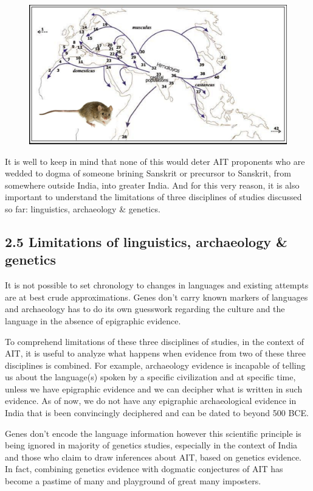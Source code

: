 \newpage

\begin{figure}[!htbp]
\includegraphics[scale=0.22]{"images/8-11.jpg"}
\caption{}\label{art8-fig11}
\end{figure}

It is well to keep in mind that none of this would deter AIT proponents who are wedded to dogma of someone brining Sanskrit or precursor to Sanskrit, from somewhere outside India, into greater India. And for this very reason, it is also important to understand the limitations of three disciplines of studies discussed so far: linguistics, archaeology \& genetics.


\subsection*{2.5 Limitations of linguistics, archaeology \& genetics}

It is not possible to set chronology to changes in languages and existing attempts are at best crude approximations. Genes don’t carry known markers of languages and archaeology has to do its own guesswork regarding the culture and the language in the absence of epigraphic evidence.

To comprehend limitations of these three disciplines of studies, in the context of AIT, it is useful to analyze what happens when evidence from two of these three disciplines is combined. For example, archaeology evidence is incapable of telling us about the language(s) spoken by a specific civilization and at specific time, unless we have epigraphic evidence and we can decipher what is written in such evidence. As of now, we do not have any epigraphic archaeological evidence in India that is been convincingly deciphered and can be dated to beyond 500 BCE.

Genes don’t encode the language information however this scientific principle is being ignored in majority of genetics studies, especially in the context of India and those who claim to draw inferences about AIT, based on genetics evidence. In fact, combining genetics evidence with dogmatic conjectures of AIT has become a pastime of many and playground of great many imposters.


